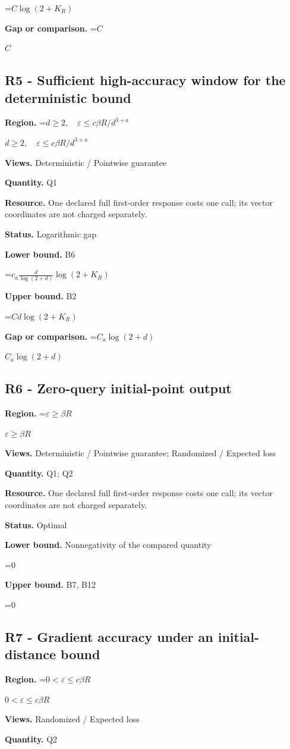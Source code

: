 \documentclass[10pt,a4paper]{article}
\newcommand{\AtlasMath}[1]{\par\begingroup\centering\setbox0=\hbox{$\displaystyle #1$}\ifdim\wd0>1.4\linewidth\typeout{ATLAS WIDE FORMULA: \the\wd0}\fi\ifdim\wd0>\linewidth\resizebox{\linewidth}{!}{\box0}\else\box0\fi\par\endgroup}
\newcommand{\AtlasInlineMath}[1]{\begingroup\setbox0=\hbox{$#1$}\ifdim\wd0>.4\linewidth\endgroup\AtlasMath{#1}\else\endgroup$#1$\fi}
\begin{document}
\AtlasMath{C\log(2+K_R)}
\textbf{Gap or comparison.} \AtlasInlineMath{C}

\subsection{R5 - Sufficient high-accuracy window for the deterministic bound}
\textbf{Region.} \AtlasInlineMath{d\ge2,\quad\varepsilon\le c\beta R/d^{3+a}}

\textbf{Views.} Deterministic / Pointwise guarantee

\textbf{Quantity.} Q1

\textbf{Resource.} One declared full first-order response costs one call; its vector coordinates are not charged separately.

\textbf{Status.} Logarithmic gap

\textbf{Lower bound.} B6

\AtlasMath{c_a\frac d{\log(2+d)}\log(2+K_R)}
\textbf{Upper bound.} B2

\AtlasMath{C d\log(2+K_R)}
\textbf{Gap or comparison.} \AtlasInlineMath{C_a\log(2+d)}

\subsection{R6 - Zero-query initial-point output}
\textbf{Region.} \AtlasInlineMath{\varepsilon\ge\beta R}

\textbf{Views.} Deterministic / Pointwise guarantee; Randomized / Expected loss

\textbf{Quantity.} Q1; Q2

\textbf{Resource.} One declared full first-order response costs one call; its vector coordinates are not charged separately.

\textbf{Status.} Optimal

\textbf{Lower bound.} Nonnegativity of the compared quantity

\AtlasMath{0}
\textbf{Upper bound.} B7, B12

\AtlasMath{0}
\subsection{R7 - Gradient accuracy under an initial-distance bound}
\textbf{Region.} \AtlasInlineMath{0<\varepsilon\le c\beta R}

\textbf{Views.} Randomized / Expected loss

\textbf{Quantity.} Q2
\end{document}
